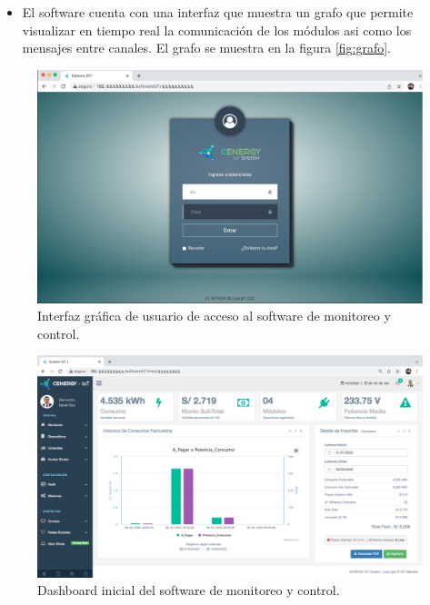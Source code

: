 \begin{itemize}
\item El software cuenta con una interfaz que muestra un grafo que permite visualizar en tiempo real la comunicación de los módulos asi como los mensajes entre canales. El grafo se muestra en la figura \ref{fig:grafo}.


\end{itemize}






\begin{landscape} %
\begin{figure}[htpb]
\centering 
\includegraphics[width=1.55\textwidth]{./Figures/gui/0.png}
\caption{Interfaz gráfica de usuario de acceso al software de monitoreo y control.}
\label{fig:gui0}
\end{figure}
\end{landscape} %


\begin{landscape} %
\begin{figure}[htpb]
\centering 
\includegraphics[width=1.55\textwidth]{./Figures/gui/1.png}
\caption{Dashboard inicial del software de monitoreo y control.}
\label{fig:gui1}
\end{figure}
\end{landscape} %


